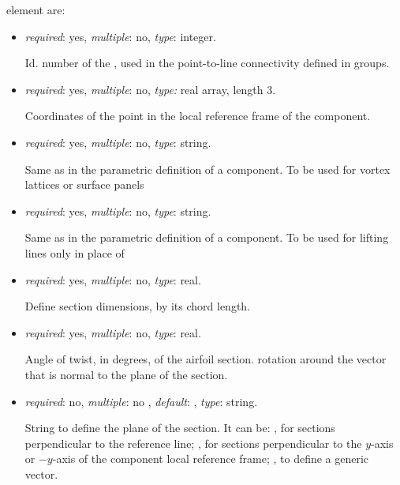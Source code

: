  element are:
\begin{itemize}

\item {} \textit{required}: yes, \textit{multiple}: no, \textit{type}: integer.

    Id. number of the , used in the point-to-line 
    connectivity defined in  groups.

\item {}  \textit{required}: yes, \textit{multiple}: 
      no, \textit{type:} real array, length 3.

    Coordinates of the point in the local reference frame of the component.
    
\item {}  \textit{required}: yes, \textit{multiple}: no, \textit{type}: string.

    Same as in the parametric definition of a component. To be used for vortex 
    lattices or surface panels
    
\item {}  \textit{required}: yes, \textit{multiple}: no, 
    \textit{type}: string.

    Same as in the parametric definition of a component. 
    To be used for lifting lines only in place of 

\item {}  \textit{required}: yes, \textit{multiple}: no, \textit{type}: real.

    Define section dimensions, by its chord length.

\item {}  \textit{required}: yes, \textit{multiple}: no, \textit{type}: real.

    Angle of twist, in degrees, of the airfoil section. rotation around 
    the vector that is normal to the plane of the section.

\item {} \textit{required}: no, \textit{multiple}: no , 
\textit{default}:  , \textit{type}: string.

    String to define the plane of the section. It can be: , 
    for sections perpendicular to the reference line; , 
     for sections perpendicular to the $y$-axis or 
    $-y$-axis of the component local reference frame; , 
    to define a generic vector. 


\end{itemize}
